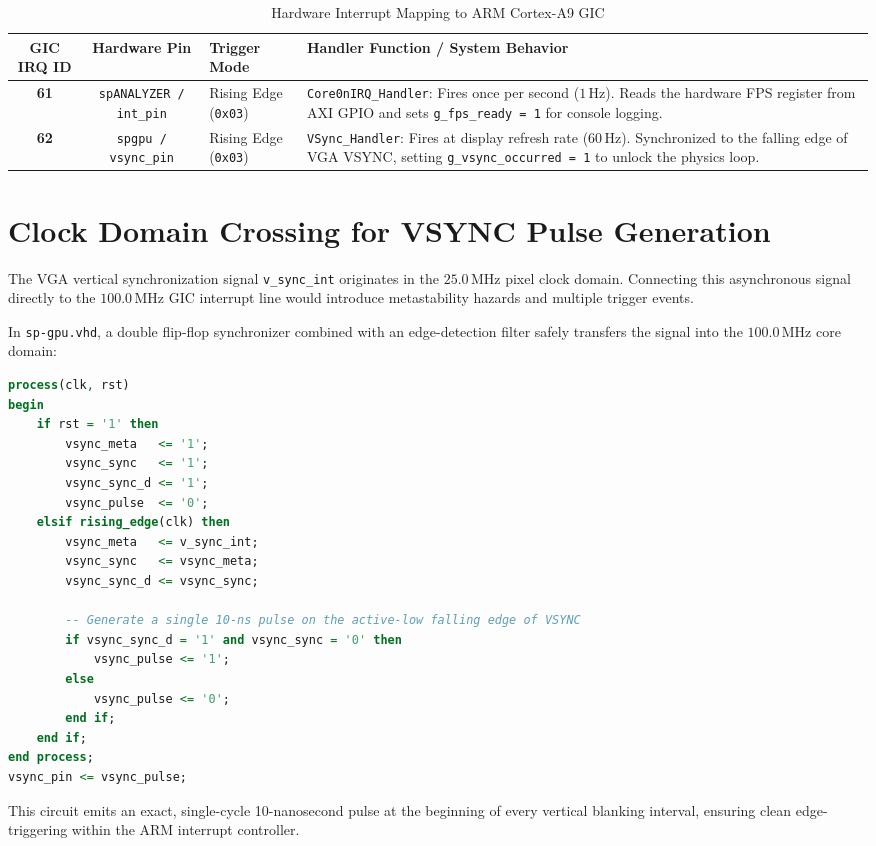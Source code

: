 \begin{table}[htbp]
\centering
\caption{Hardware Interrupt Mapping to ARM Cortex-A9 GIC}
\label{tab:interrupt_mapping}
\begin{tabular}{@{}cclp{7.0cm}@{}}
\toprule
\textbf{GIC IRQ ID} & \textbf{Hardware Pin} & \textbf{Trigger Mode} & \textbf{Handler Function / System Behavior} \\ \midrule
\textbf{61} & \texttt{spANALYZER / int\_pin} & Rising Edge (\texttt{0x03}) & \texttt{Core0nIRQ\_Handler}: Fires once per second ($1\,\text{Hz}$). Reads the hardware FPS register from AXI GPIO and sets \texttt{g\_fps\_ready = 1} for console logging. \\
\textbf{62} & \texttt{spgpu / vsync\_pin} & Rising Edge (\texttt{0x03}) & \texttt{VSync\_Handler}: Fires at display refresh rate ($60\,\text{Hz}$). Synchronized to the falling edge of VGA VSYNC, setting \texttt{g\_vsync\_occurred = 1} to unlock the physics loop. \\ \bottomrule
\end{tabular}
\end{table}

\section{Clock Domain Crossing for VSYNC Pulse Generation}
The VGA vertical synchronization signal \texttt{v\_sync\_int} originates in the $25.0\,\text{MHz}$ pixel clock domain. Connecting this asynchronous signal directly to the $100.0\,\text{MHz}$ GIC interrupt line would introduce metastability hazards and multiple trigger events.

In \texttt{sp-gpu.vhd}, a double flip-flop synchronizer combined with an edge-detection filter safely transfers the signal into the $100.0\,\text{MHz}$ core domain:
\begin{lstlisting}[language=VHDL, caption={Clock Domain Crossing and VSYNC Pulse Generator in \texttt{sp-gpu.vhd}.}, label={lst:vsync_pulse}]
process(clk, rst)
begin
    if rst = '1' then
        vsync_meta   <= '1';
        vsync_sync   <= '1';
        vsync_sync_d <= '1';
        vsync_pulse  <= '0';
    elsif rising_edge(clk) then
        vsync_meta   <= v_sync_int;
        vsync_sync   <= vsync_meta;
        vsync_sync_d <= vsync_sync;
        
        -- Generate a single 10-ns pulse on the active-low falling edge of VSYNC
        if vsync_sync_d = '1' and vsync_sync = '0' then
            vsync_pulse <= '1';
        else
            vsync_pulse <= '0';
        end if;
    end if;
end process;
vsync_pin <= vsync_pulse;
\end{lstlisting}
This circuit emits an exact, single-cycle 10-nanosecond pulse at the beginning of every vertical blanking interval, ensuring clean edge-triggering within the ARM interrupt controller.


